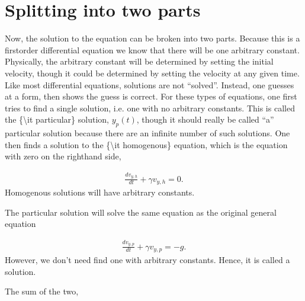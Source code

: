 \documentclass[letterpaper,10pt,english]{sphinxmanual}
\begin{document}
\section{Splitting into two parts}
\label{\detokenize{chapter1:splitting-into-two-parts}}
Now, the solution to the equation can be broken into two
parts. Because this is a first\sphinxhyphen{}order differential equation we know
that there will be one arbitrary constant. Physically, the arbitrary
constant will be determined by setting the initial velocity, though it
could be determined by setting the velocity at any given time. Like
most differential equations, solutions are not “solved”. Instead,
one guesses at a form, then shows the guess is correct. For these
types of equations, one first tries to find a single solution,
i.e. one with no arbitrary constants. This is called the \{\textbackslash{}it
particular\} solution, \(y_p(t)\), though it should really be called
“a” particular solution because there are an infinite number of such
solutions. One then finds a solution to the \{\textbackslash{}it homogenous\} equation,
which is the equation with zero on the right\sphinxhyphen{}hand side,




\begin{equation*}
\begin{split}
\begin{equation}
\frac{dv_{y,h}}{dt}+\gamma v_{y,h}=0.
\label{_auto7} \tag{7}
\end{equation}
\end{split}
\end{equation*}
Homogenous solutions will have arbitrary constants.

The particular solution will solve the same equation as the original
general equation




\begin{equation*}
\begin{split}
\begin{equation}
\frac{dv_{y,p}}{dt}+\gamma v_{y,p}=-g.
\label{_auto8} \tag{8}
\end{equation}
\end{split}
\end{equation*}
However, we don’t need find one with arbitrary constants. Hence, it is
called a  solution.

The sum of the two,
\end{document}
